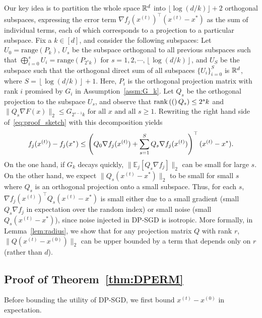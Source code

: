 Our key idea is to partition the whole space $\mathbb{R}^d$ into  $\lfloor \log(d/k) \rfloor + 2$ orthogonal subspaces, expressing the error term $\nabla f_j(x^{(t)})^\top (x^{(t)}-x^*)$ as the sum of individual terms, each of which corresponds to a projection to a particular subspace.
Fix a $k \in [d]$, and consider the following subspaces:
Let $U_{0}=\text{range}(P_{k})$,
 $U_{s}$ be the subspace orthogonal to all previous subspaces such that $\bigoplus_{i=0}^s U_i = \text{range}(P_{2^sk})$ for $s=1,2,\cdots,\left\lfloor \log(d/k)\right\rfloor $,
and $U_{S}$ be the subspace such that the orthogonal direct sum of all subspaces $\{U_i\}_{i=0}^S$ is $\mathbb{R}^d$, where $S=\left\lfloor \log(d/k)\right\rfloor +1$.
Here, $P_{i}$ is the orthogonal projection matrix with rank $i$ promised by $G_{i}$ in Assumption~\ref{assm:G_k}. 
Let $Q_{s}$ be the orthogonal projection to the subspace $U_{s}$, and observe that $\mathrm{rank}\left((\right)Q_{s}) \leq 2^{s}k$ and
$\|Q_{s}\nabla F(x)\|_{2}\leq G_{2^{s-1}k}\text{ for all }x\text{ and all }s\geq1.$
Rewriting the right hand side of~\eqref{eq:proof_sketch} with this decomposition yields
$$
f_{j}(x^{(t)})-f_{j}(x^{*})  \leq \left( Q_{0}\nabla f_{j}(x^{(t)})+\sum_{s=1}^{S} Q_{s}\nabla f_{j}(x^{(t)})\right)^{\top}(x^{(t)}-x^{*}).    
$$
On the one hand, if $G_k$ decays quickly, $\| \mathbb{E}_j [  Q_{s} \nabla f_{j} ] \|_2$ can be small for large $s$. 
On the other hand, we expect $\|Q_{s} (x^{(t)}-x^{*})\|_2$ to be small for small $s$ where $Q_{s}$ is an orthogonal projection onto a small subspace. 
Thus, for each $s$, $\nabla f_{j}(x^{(t)})^{\top} Q_{s} (x^{(t)}-x^{*})$ is small either due to a small gradient (small $Q_s \nabla f_{j}$ in expectation over the random index) or small noise (small $Q_{s} (x^{(t)}-x^{*})$), since noise injected in DP-SGD is isotropic. 
More formally, in Lemma~\ref{lem:radius}, we show that for any projection matrix $Q$ with rank $r$, $\|Q(x^{(t)}-x^{(0)})\|_2$ can be upper bounded by a term that depends only on $r$ (rather than $d$).


\subsection{Proof of Theorem~\ref{thm:DPERM}}\label{app:dperm_proof}

Before bounding the utility of DP-SGD, we first bound $x^{(t)}-x^{(0)}$ in expectation.

